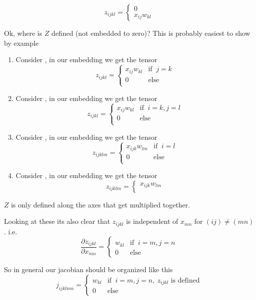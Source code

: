 \documentclass[11pt]{article}
\begin{document}
\[
z_{ijkl} = 
\begin{cases}
    0 \\
    x_{ij}w_{kl}
\end{cases}
\]

Ok, where is $Z$ defined (not embedded to zero)? This is probably easiest to show by example
\begin{enumerate}
    \item Consider , in our embedding we get the tensor
    \[
        z_{ijkl} = 
        \begin{cases}
        x_{ij}w_{kl} & \text{if } \ j = k \\
        0  & \text{else } \\
        \end{cases}
    \]
    \item Consider , in our embedding we get the tensor
    \[
        z_{ijkl} = 
        \begin{cases}
        x_{ij}w_{kl} & \text{if }\ i = k, j = l  \\
        0  & \text{else} \\
        \end{cases}
    \]
    \item Consider , in our embedding we get the tensor
    \[
        z_{ijklm} = 
        \begin{cases}
        x_{ijk}w_{lm} & \text{if } \ i = l \\
        0  & \text{else} \\
        \end{cases}
    \]
    \item Consider , in our embedding we get the tensor
    \[
        z_{ijklm} = 
        \begin{cases}
        x_{ijk}w_{lm}  \\
        \end{cases}
    \]
\end{enumerate}


$Z$ is only defined along the axes that get multiplied together. 

Looking at these its also clear that $z_{ijkl}$ is independent of $x_{mn}$ for $(ij)\neq(mn)$. i.e.
\[\frac{\partial z_{ijkl}}{\partial x_{mn}} = 
\begin{cases}
    w_{kl} & \text{if } \ i = m, j = n \\
    0 & \text{else}
\end{cases}\]

So in general our jacobian should be organized like this
\[j_{ijklmn} = 
\begin{cases}
    w_{kl} & \text{if } \ i=m,j=n, \ z_{ijkl} \text{ is defined}\\
    0 & \text{else}
\end{cases}\]
\end{document}
